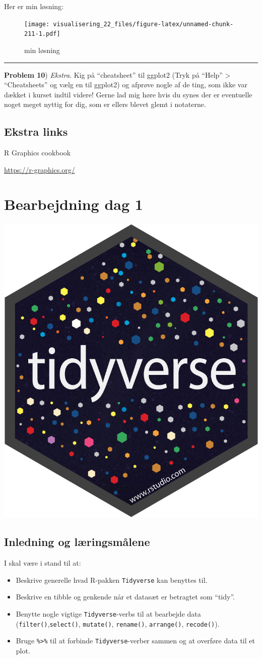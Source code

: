 \documentclass[
]{book}
\providecommand{\tightlist}{%
  \setlength{\itemsep}{0pt}\setlength{\parskip}{0pt}}
\begin{document}
Her er min løsning:

\begin{figure}
\centering
\texttt{[image: visualisering\_22\_files/figure-latex/unnamed-chunk-211-1.pdf]}
\caption{\label{fig:unnamed-chunk-211}min løsning}
\end{figure}

\begin{center}\rule{0.5\linewidth}{0.5pt}\end{center}

\textbf{Problem 10}) \emph{Ekstra}. Kig på ``cheatsheet'' til ggplot2 (Tryk på ``Help'' \textgreater{} ``Cheatsheets'' og vælg en til ggplot2) og afprøve nogle af de ting, som ikke var dækket i kurset indtil videre! Gerne lad mig høre hvis du synes der er eventuelle noget meget nyttig for dig, som er ellers blevet glemt i notaterne.

\hypertarget{ekstra-links-1}{%
\section{Ekstra links}\label{ekstra-links-1}}

R Graphics cookbook

\url{https://r-graphics.org/}

\hypertarget{data}{%
\chapter{Bearbejdning dag 1}\label{data}}

\includegraphics[width=0.15\linewidth]{plots/hex-tidyverse}

\hypertarget{inledning-og-luxe6ringsmuxe5lene}{%
\section{Inledning og læringsmålene}\label{inledning-og-luxe6ringsmuxe5lene}}

I skal være i stand til at:

\begin{itemize}
\tightlist
\item
  Beskrive generelle hvad R-pakken \texttt{Tidyverse} kan benyttes til.
\item
  Beskrive en tibble og genkende når et datasæt er betragtet som ``tidy''.
\item
  Benytte nogle vigtige \texttt{Tidyverse}-verbs til at bearbejde data (\texttt{filter()},\texttt{select()}, \texttt{mutate()}, \texttt{rename()}, \texttt{arrange()}, \texttt{recode()}).
\item
  Bruge \texttt{\%\textgreater{}\%} til at forbinde \texttt{Tidyverse}-verber sammen og at overføre data til et plot.
\end{itemize}
\end{document}
